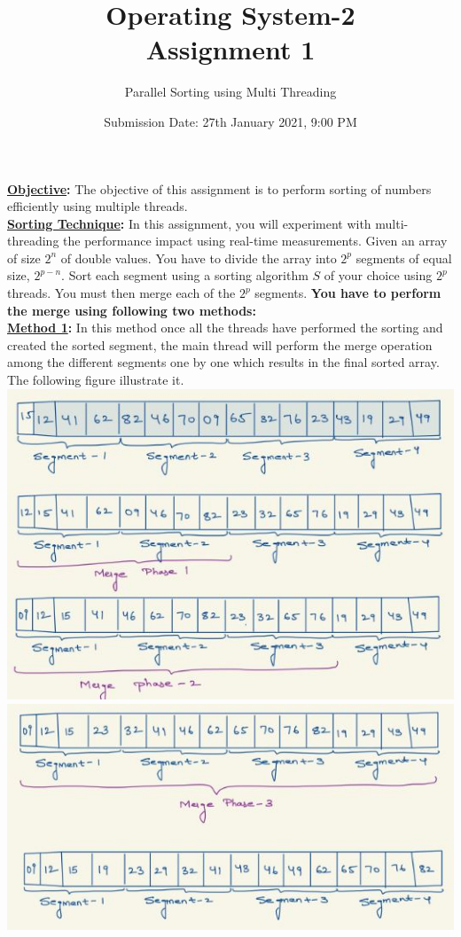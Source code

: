\documentclass{article}
\title{Operating System-2 \\  Assignment 1}
\author{Parallel Sorting using Multi Threading }
\date{Submission Date: 27th January 2021, 9:00 PM }
\begin{document}
\maketitle
\noindent\textbf{\underline {Objective}:} The objective of this assignment is to perform sorting of numbers efficiently using multiple threads. 
\\

\noindent\textbf{\underline{Sorting Technique}:} In this assignment, you will experiment with multi-threading the performance impact using real-time measurements. Given an array of size $2^n$ of double values. You have to divide the array into $2^p$ segments of equal size, $2^{p-n}$. Sort each segment using a sorting algorithm $S$ of your choice using $2^p$ threads. You must then merge each of the $2^p$ segments. \textbf{You have to perform the merge using following two methods:}\\
\noindent\textbf{\underline {Method 1}:} In this method once all the threads have performed the sorting and created the sorted segment, the main thread will perform the merge operation among the different segments one by one which results in the final sorted array. The following figure illustrate it. \\
\includegraphics[width=\textwidth]{IMG1.JPG}
\includegraphics[width=\textwidth]{img2.JPG}
\\\\ 
\end{document}
